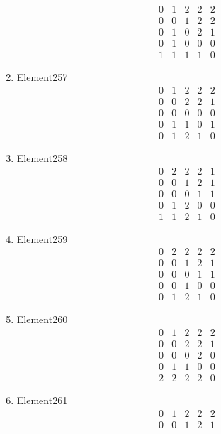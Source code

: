 \documentclass[12pt]{article}
\begin{document}
\begin{multicols}{3}
\begin{enumerate}
\begin{equation*}
\begin{array}{ccccc}
0&1&2&2&2\\
0&0&1&2&2\\
0&1&0&2&1\\
0&1&0&0&0\\
1&1&1&1&0
\end{array}
\end{equation*}
\item Element257
\begin{equation*}
\begin{array}{ccccc}
0&1&2&2&2\\
0&0&2&2&1\\
0&0&0&0&0\\
0&1&1&0&1\\
0&1&2&1&0
\end{array}
\end{equation*}
\item Element258
\begin{equation*}
\begin{array}{ccccc}
0&2&2&2&1\\
0&0&1&2&1\\
0&0&0&1&1\\
0&1&2&0&0\\
1&1&2&1&0
\end{array}
\end{equation*}
\item Element259
\begin{equation*}
\begin{array}{ccccc}
0&2&2&2&2\\
0&0&1&2&1\\
0&0&0&1&1\\
0&0&1&0&0\\
0&1&2&1&0
\end{array}
\end{equation*}
\item Element260
\begin{equation*}
\begin{array}{ccccc}
0&1&2&2&2\\
0&0&2&2&1\\
0&0&0&2&0\\
0&1&1&0&0\\
2&2&2&2&0
\end{array}
\end{equation*}
\item Element261
\begin{equation*}
\begin{array}{ccccc}
0&1&2&2&2\\
0&0&1&2&1\\

\end{array}
\end{equation*}
\end{enumerate}
\end{multicols}
\end{document}
